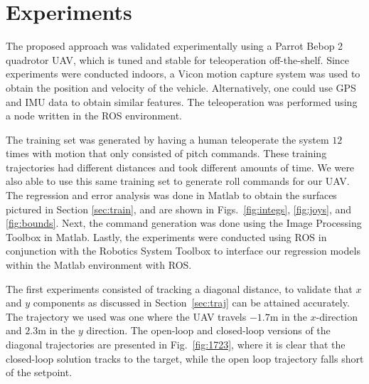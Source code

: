 \documentclass[letterpaper, 10 pt, conference]{ieeeconf}  %
\begin{document}


\section{Experiments} \label{sec:exper}

The proposed approach was validated experimentally using a Parrot Bebop 2 quadrotor UAV, which is tuned and stable for teleoperation off-the-shelf. Since experiments were conducted indoors, a Vicon motion capture system was used to obtain the position and velocity of the vehicle. Alternatively, one could use GPS and IMU data to obtain similar features. The teleoperation was performed using a node written in the ROS environment.

The training set was generated by having a human teleoperate the system $12$ times with motion that only consisted of pitch commands. These training trajectories had different distances and took different amounts of time. We were also able to use this same training set to generate roll commands for our UAV. The regression and error analysis was done in Matlab to obtain the surfaces pictured in Section \ref{sec:train}, and are shown in Figs.~\ref{fig:integs}, \ref{fig:joys}, and \ref{fig:bounds}. Next, the command generation was done using the Image Processing Toolbox in Matlab. Lastly, the experiments were conducted using ROS in conjunction with the Robotics System Toolbox to interface our regression models within the Matlab environment with ROS.

The first experiments consisted of tracking a diagonal distance, to validate that $x$ and $y$ components as discussed in Section~\ref{sec:traj} can be attained accurately. The trajectory we used was one where the UAV travels $-1.7$m in the $x$-direction and $2.3$m in the $y$ direction. The open-loop and closed-loop versions of the diagonal trajectories are presented in Fig.~\ref{fig:1723}, where it is clear that the closed-loop solution tracks to the target, while the open loop trajectory falls short of the setpoint.
\end{document}
